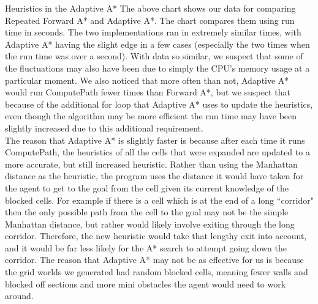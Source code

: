 \documentclass[12pt]{article}
\theoremstyle{definition}
\begin{document}
\begin{onehalfspacing}
\begin{section}{Heuristics in the Adaptive A*}
The above chart shows our data for comparing Repeated Forward A* and Adaptive A*. The chart compares them using run time in seconds. The two implementations ran in extremely similar times, with Adaptive A* having the slight edge in a few cases (especially the two times when the run time was over a second). With data so similar, we suspect that some of the fluctuations may also have been due to simply the CPU's memory usage at a particular moment. We also noticed that more often than not, Adaptive A* would run ComputePath fewer times than Forward A*, but we suspect that because of the additional for loop that Adaptive A* uses to update the heuristics, even though the algorithm may be more efficient the run time may have been slightly increased due to this additional requirement. \\[0.5em]
The reason that Adaptive A* is slightly faster is because after each time it runs ComputePath,  the heuristics of all the cells that were expanded are updated to a more accurate, but still increased heuristic. Rather than using the Manhattan distance as the heuristic, the program uses the distance it would have taken for the agent to get to the goal from the cell given its current knowledge of the blocked cells. For example if there is a cell which is at the end of a long ``corridor" then the only possible path from the cell to the goal may not be the simple Manhattan distance, but rather would likely involve exiting through the long corridor. Therefore, the new heuristic would take that lengthy exit into account, and it would be far less likely for the A* search to attempt going down the corridor. The reason that Adaptive A* may not be as effective for us is because the grid worlds we generated had random blocked cells, meaning fewer walls and blocked off sections and more mini obstacles the agent would need to work around.


\end{section}
\end{onehalfspacing}
\end{document}

